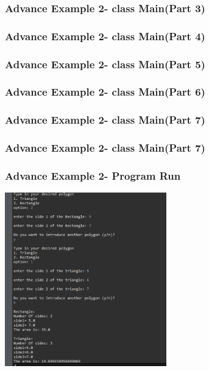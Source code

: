 \documentclass[11pt]{beamer}
\begin{document}
\begin{frame}
\frametitle{Advance Example 2- class Main(Part 3)}

\end{frame}


\begin{frame}
\frametitle{Advance Example 2- class Main(Part 4)}

\end{frame}

\begin{frame}
\frametitle{Advance Example 2- class Main(Part 5)}

\end{frame}

\begin{frame}
\frametitle{Advance Example 2- class Main(Part 6)}

\end{frame}

\begin{frame}
\frametitle{Advance Example 2- class Main(Part 7)}

\end{frame}

\begin{frame}
\frametitle{Advance Example 2- class Main(Part 7)}

\end{frame}

\begin{frame}
\frametitle{Advance Example  2- Program Run}
\begin{center}
{\includegraphics[width=7.0cm]{img/RunAdvancedExample2.png}}
\end{center}
\end{frame}
\end{document}
